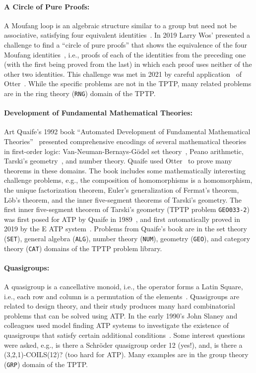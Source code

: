 \documentclass[runningheads]{llncs}
\begin{document}
\paragraph{A Circle of Pure Proofs:}
A Moufang loop is an algebraic structure similar to a group but need not be associative, 
satisfying four equivalent identities~\cite{Mou35}.
In 2019 Larry Wos' presented a challenge to find a ``circle of pure proofs'' that shows the 
equivalence of the four Moufang identities~\cite{Wos19}, i.e., proofs of each of the identities
from the preceding one (with the first being proved from the last) in which each proof uses
neither of the other two identities.
This challenge was met in 2021 by careful application~\cite{Ver22} of Otter~\cite{McC03-Otter}.
While the specific problems are not in the TPTP, many related problems are in the ring theory 
({\tt RNG}) domain of the TPTP.

\paragraph{Development of Fundamental Mathematical Theories:}
Art Quaife's 1992 book ``Automated Development of Fundamental Mathematical 
Theories''~\cite{Qua92-Book} presented comprehensive encodings of several mathematical theories 
in first-order logic:
Van-Neuman-Bernays-G{\"o}del set theory~\cite{Qua92-JAR}, Peano arithmetic, Tarski's 
geometry~\cite{SST83}, and number theory.
Quaife used Otter~\cite{McC03-Otter} to prove many theorems in these domains.
The book includes some mathematically interesting challenge problems, e.g., the composition of 
homomorphisms is a homomorphism, the unique factorization theorem, Euler's generalization of 
Fermat's theorem, L{\"o}b's theorem, and the inner five-segment theorems of Tarski's geometry.
The first inner five-segment theorem of Tarski's geometry (TPTP problem {\tt GEO033-2}) was first 
posed for ATP by Quaife in 1989~\cite{Qua89}, and first automatically proved in 2019 by the E ATP 
system~\cite{SCV19}.
Problems from Quaife's book are in the set theory ({\tt SET}), general algebra ({\tt ALG}), number 
theory ({\tt NUM}), geometry ({\tt GEO}), and category theory ({\tt CAT}) domains of the TPTP 
problem library.

\paragraph{Quasigroups:}
A quasigroup is a cancellative monoid, i.e., the operator forms a Latin Square, i.e., each row 
and column is a permutation of the elements~\cite{MMM07}.
Quasigroups are related to design theory, and their study produces many hard combinatorial 
problems that can be solved using ATP.
In the early 1990's John Slaney and colleagues used model finding ATP systems to investigate the 
existence of quasigroups that satisfy certain additional conditions~\cite{SFS95}.
Some interest questions were asked, e.g., is there a Schr{\"o}der quasigroup order 12 (yes!),
and, is there a (3,2,1)-COILS(12)? (too hard for ATP).
Many examples are in the group theory ({\tt GRP}) domain of the TPTP.
\end{document}
